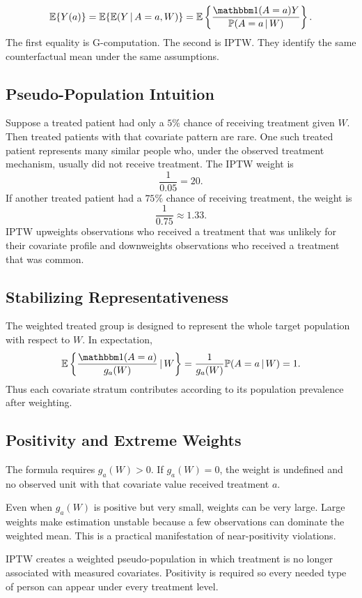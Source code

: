 \begin{identificationbox}
\[
\E\{\Ya{a}\}
=
\E\{\E(Y\given A=a,W)\}
=
\E\left\{
\frac{\ind(A=a)Y}{\Prob(A=a\given W)}
\right\}.
\]
The first equality is G-computation. The second is IPTW. They identify the same counterfactual mean under the same assumptions.
\end{identificationbox}

\subsection{Pseudo-Population Intuition}

Suppose a treated patient had only a $5\%$ chance of receiving treatment given $W$. Then treated patients with that covariate pattern are rare. One such treated patient represents many similar people who, under the observed treatment mechanism, usually did not receive treatment. The IPTW weight is
\[
\frac{1}{0.05}=20.
\]
If another treated patient had a $75\%$ chance of receiving treatment, the weight is
\[
\frac{1}{0.75}\approx 1.33.
\]
IPTW upweights observations who received a treatment that was unlikely for their covariate profile and downweights observations who received a treatment that was common.

\subsection{Stabilizing Representativeness}

The weighted treated group is designed to represent the whole target population with respect to $W$. In expectation,
\[
\E\left\{\frac{\ind(A=a)}{g_a(W)}\given W\right\}
=
\frac{1}{g_a(W)}\Prob(A=a\given W)
=1.
\]
Thus each covariate stratum contributes according to its population prevalence after weighting.

\subsection{Positivity and Extreme Weights}

The formula requires $g_a(W)>0$. If $g_a(W)=0$, the weight is undefined and no observed unit with that covariate value received treatment $a$.

Even when $g_a(W)$ is positive but very small, weights can be very large. Large weights make estimation unstable because a few observations can dominate the weighted mean. This is a practical manifestation of near-positivity violations.

\begin{keyidea}
IPTW creates a weighted pseudo-population in which treatment is no longer associated with measured covariates. Positivity is required so every needed type of person can appear under every treatment level.
\end{keyidea}
